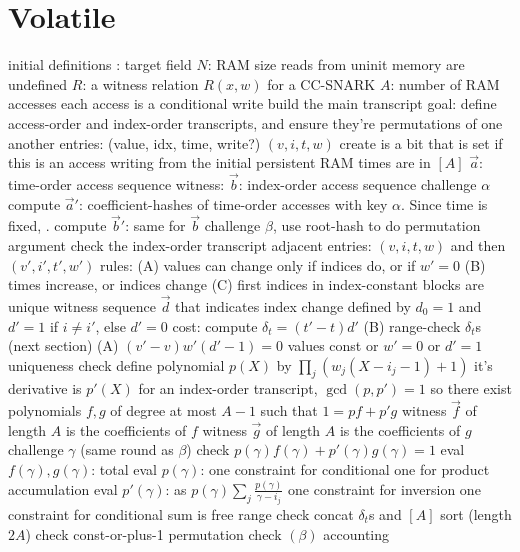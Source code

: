 \section{Volatile}
\begin{outline}
\1 initial definitions
  \2 \FF: target field
  \2 $N$: RAM size
  \2 reads from uninit memory are undefined
  \2 $R$: a witness relation $R(x, w)$ for a CC-SNARK
    \3 $A$: number of RAM accesses
      \4 each access is a conditional write
\1 build the main transcript
  \2 goal: define access-order and index-order transcripts, and ensure they're
  permutations of one another
  \2 entries: (value, idx, time, write?) $(v, i, t, w)$
    \3 create is a bit that is set if this is an access writing from the initial persistent RAM
    \3 times are in $[A]$
  \2 $\vec a$: time-order access sequence
  \2 witness: $\vec b$: index-order access sequence
  \2 challenge $\alpha$
  \2 compute $\vec a'$: coefficient-hashes of time-order accesses with key
  $\alpha$.
    \3 Since time is fixed, .
  \2 compute $\vec b'$: same for $\vec b$
    \3 
  \2 challenge $\beta$, use root-hash to do permutation argument
    \3 
\1 check the index-order transcript
  \2 adjacent entries: $(v, i, t, w)$ and then $(v', i', t', w')$
  \2 rules:
    \3 (A) values can change only if indices do, or if $w'=0$
    \3 (B) times increase, or indices change
    \3 (C) first indices in index-constant blocks are unique
  \2 witness sequence $\vec d$ that indicates index change
    \3 defined by $d_0=1$ and $d'=1$ if $i \ne i'$, else $d'=0$
    \3 cost: 
  \2 compute $\delta_t = (t'-t)d'$ 
  \2 (B) range-check $\delta_t$s (next section)
  \2 (A) $(v'-v)w'(d'-1)=0$
    \3 
    \3 values const or $w'=0$ or $d'=1$
\1 uniqueness check
  \2 define polynomial $p(X)$ by $\prod_j (w_j(X - i_j - 1) + 1)$
  \2 it's derivative is $p'(X)$
  \2 for an index-order transcript, $\gcd(p,p')=1$
    \3 so there exist polynomials $f,g$ of degree at most $A-1$ such that $1 = pf + p'g$
  \2 witness $\vec f$ of length $A$ is the coefficients of $f$
  \2 witness $\vec g$ of length $A$ is the coefficients of $g$
  \2 challenge $\gamma$ (same round as $\beta$)
  \2 check $p(\gamma)f(\gamma) + p'(\gamma)g(\gamma)=1$
  \2 eval $f(\gamma), g(\gamma)$:  total
  \2 eval $p(\gamma)$: 
    \3 one constraint for conditional
    \3 one for product accumulation
  \2 eval $p'(\gamma)$: 
    \3 as $p(\gamma)\sum_j\frac{p(\gamma)}{\gamma-i_j}$
    \3 one constraint for inversion
    \3 one constraint for conditional
    \3 sum is free
\1 range check
  \2 concat $\delta_t$s and $[A]$
  \2 sort (length $2A$)
  \2 check const-or-plus-1 
  \2 permutation check $(\beta)$ 
\1 accounting
  \2 
\end{outline}

